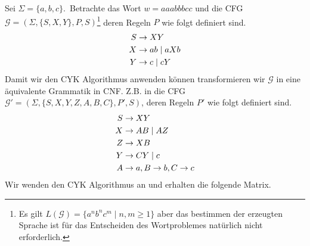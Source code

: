 \begin{Bsp}
	Sei $\Sigma=\{a,b,c\}$.\
	Betrachte das Wort $w=aaabbbcc$ und die \ac{CFG} $\mathcal{G} = (\Sigma, \{S,X,Y\}, P, S)$\footnote{
		Es gilt $L(\mathcal{G})=\{a^nb^nc^m \mid n,m\geq 1\}$ 
		aber das bestimmen der erzeugten Sprache ist für das Entscheiden des Wortproblemes 
		natürlich nicht erforderlich.}
	deren Regeln $P$ wie folgt definiert sind.
	\begin{align*}
		S &\-> XY\\
		X &\-> ab \mid aXb\\
		Y &\-> c \mid cY
	\end{align*}
	Damit wir den \ac{CYK} Algorithmus anwenden können transformieren wir $\mathcal{G}$ in eine äquivalente Grammatik in CNF.
	Z.B. in die \ac{CFG} $\mathcal{G'} = (\Sigma, \{S, X, Y, Z, A, B, C\}, P', S)$, deren Regeln $P'$ wie folgt definiert sind.
	\begin{align*}
		S &\-> XY\\
		X &\-> AB \mid AZ\\
		Z &\-> XB\\
		Y &\-> CY \mid c\\
		A &\-> a, B \-> b, C \-> c
	\end{align*}
	Wir wenden den CYK Algorithmus an und erhalten die folgende Matrix.
	


\end{Bsp}
